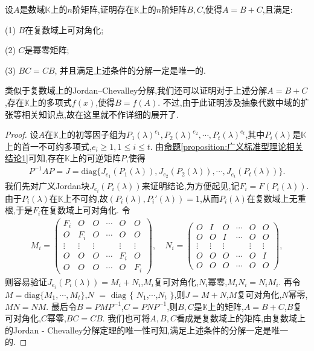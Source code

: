 \documentclass[../../main.tex]{subfiles}%
\begin{document}
\begin{theorem}\label{theorem:数K上的Jordan-Chevalley分解}
设$A$是数域$\mathbb{K}$上的$n$阶矩阵,证明存在$\mathbb{K}$上的$n$阶矩阵$B,C$,使得$A = B + C$,且满足:

(1) $B$在复数域上可对角化; 

(2) $C$是幂零矩阵; 

(3) $BC = CB$,
并且满足上述条件的分解一定是唯一的.
\end{theorem}
\begin{remark}
类似于复数域上的Jordan--Chevalley分解,我们还可以证明对于上述分解$A = B + C$,存在$\mathbb{K}$上的多项式$f(x)$,使得$B = f(A)$. 不过,由于此证明涉及抽象代数中域的扩张等相关知识点,故在这里就不作详细的展开了. 
\end{remark}
\begin{proof}
设$A$在$\mathbb{K}$上的初等因子组为$P_1(\lambda)^{e_1},P_2(\lambda)^{e_2},\cdots,P_t(\lambda)^{e_t}$,其中$P_i(\lambda)$是$\mathbb{K}$上的首一不可约多项式,$e_i\geqslant 1, 1\leqslant i\leqslant t$. 由\hyperref[proposition:广义标准型理论相关结论1]{命题\ref{proposition:广义标准型理论相关结论1}}可知,存在$\mathbb{K}$上的可逆矩阵$P$,使得
\begin{align*}
P^{-1}AP = J=\mathrm{diag}\{J_{e_1}(P_1(\lambda)),J_{e_2}(P_2(\lambda)),\cdots,J_{e_t}(P_t(\lambda))\}.
\end{align*}
我们先对广义Jordan块$J_{e_i}(P_i(\lambda))$来证明结论,为方便起见,记$F_i = F(P_i(\lambda))$. 由于$P_i(\lambda)$在$\mathbb{K}$上不可约,故$(P_i(\lambda),P_i'(\lambda)) = 1$,从而$P_i(\lambda)$在复数域上无重根,于是$F_i$在复数域上可对角化. 令
\begin{align*}
M_i = 
\begin{pmatrix}
F_i & O & O & \cdots & O & O \\
O & F_i & O & \cdots & O & O \\
\vdots & \vdots & \vdots & & \vdots & \vdots \\
O & O & O & \cdots & F_i & O \\
O & O & O & \cdots & O & F_i
\end{pmatrix}, \quad 
N_i = 
\begin{pmatrix}
O & I & O & \cdots & O & O \\
O & O & I & \cdots & O & O \\
\vdots & \vdots & \vdots & & \vdots & \vdots \\
O & O & O & \cdots & O & I \\
O & O & O & \cdots & O & O
\end{pmatrix},
\end{align*}
则容易验证$J_{e_i}(P_i(\lambda)) = M_i + N_i$,$M_i$复可对角化,$N_i$幂零,$M_iN_i = N_iM_i$. 再令$M = \mathrm{diag}\{M_1,\cdots,M_t\}$,$N $ $=$ $\mathrm{diag}$ $\{$ $N_1$,$\cdots$,$N_t$ $\}$,则$J = M + N$,$M$复可对角化,$N$幂零,$MN = NM$. 最后令$B = PMP^{-1}$,$C = PNP^{-1}$,则$B,C$是$\mathbb{K}$上的矩阵,$A = B + C$,$B$复可对角化,$C$幂零,$BC = CB$. 我们也可将$A,B,C$看成是复数域上的矩阵,由复数域上的Jordan - Chevalley分解定理的唯一性可知,满足上述条件的分解一定是唯一的. 
\end{proof}
\end{document}

